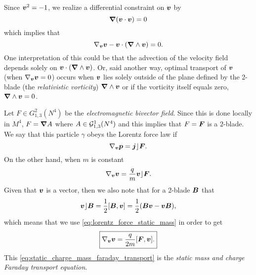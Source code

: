 \documentclass[conf]{new-aiaa}
\begin{document}
Since $\boldsymbol{v}^2=-1$, we realize a differential constraint on ${\boldsymbol{v}}$ by
\begin{equation}
    \boldsymbol{\nabla} ({\boldsymbol{v}} \cdot {\boldsymbol{v}}) = 0 
\end{equation}
which implies that
\begin{equation}
    \label{eq:velocity_covariant_derivative}
    \nabla_{\boldsymbol{v}} {\boldsymbol{v}} - {\boldsymbol{v}}\cdot (\boldsymbol{\nabla} \wedge {\boldsymbol{v}}) = 0.
\end{equation}
One interpretation of this could be that the advection of the velocity field depends solely on ${\boldsymbol{v}} \cdot (\boldsymbol{\nabla} \wedge {\boldsymbol{v}})$. Or, said another way, optimal transport of ${\boldsymbol{v}}$ (when $\nabla_{\boldsymbol{v}} {\boldsymbol{v}} = 0$) occurs when ${\boldsymbol{v}}$ lies solely outside of the plane defined by the 2-blade (the \emph{relativistic vorticity}) $\boldsymbol{\nabla} \wedge {\boldsymbol{v}}$ or if the vorticity itself equals zero, $\boldsymbol{\nabla} \wedge {\boldsymbol{v}} = 0$. 

Let $F\in G_{1,3}^2(N^4)$ be the \emph{electromagnetic bivector field}. Since this is done locally in $M^4$, $F=\boldsymbol{\nabla} A$ where $A\in \mathcal{G}_{1,3}^1(N^4)$ and this implies that $F=\boldsymbol{F}$ is a $2$-blade. We say that this particle $\gamma$ obeys the Lorentz force law if 
\begin{equation}
    \label{eq:lorentz_force_geometric_algebra}
    \nabla_{\boldsymbol{v}} \boldsymbol{p} = \boldsymbol{j}\rfloor \boldsymbol{F}.
\end{equation}
 On the other hand, when $m$ is constant
\begin{equation}
    \label{eq:lorentz_force_static_mass}
    \nabla_{\boldsymbol{v}} \boldsymbol{v} = \frac{q}{m} \boldsymbol{v} \rfloor \boldsymbol{F}.
\end{equation}
Given that $\boldsymbol{v}$ is a vector, then we also note that for a 2-blade $\boldsymbol{B}$ that
\begin{equation}
    \boldsymbol{v} \rfloor \boldsymbol{B} = \frac{1}{2}[\boldsymbol{B},\boldsymbol{v}] = \frac{1}{2}(\boldsymbol{B}\boldsymbol{v} - \boldsymbol{v}\boldsymbol{B}),
\end{equation}
which means that we use \cref{eq:lorentz_force_static_mass} in order to get
\begin{equation}
    \label{eq:static_charge_mass_faraday_transport}
    \boxed{\nabla_{\boldsymbol{v}} \boldsymbol{v} = \frac{q}{2m} [\boldsymbol{F},\boldsymbol{v}].}
\end{equation}
This \cref{eq:static_charge_mass_faraday_transport} is the \emph{static mass and charge Faraday transport equation}.
\end{document}

